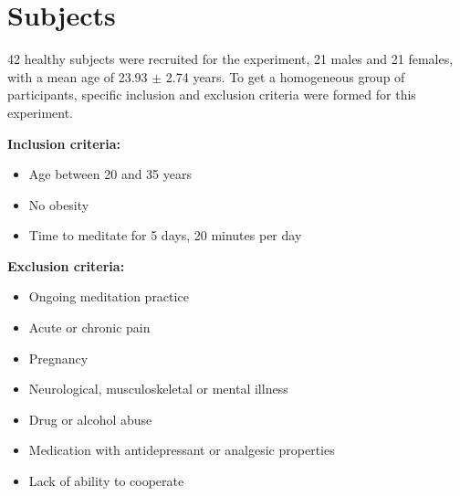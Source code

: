 

\section{Subjects}
42 healthy subjects were recruited for the experiment, 21 males and 21 females, with a mean age of 23.93 $\pm$ 2.74 years. To get a homogeneous group of participants, specific inclusion and exclusion criteria were  formed for this experiment.

\textbf{Inclusion criteria:}
\vspace{-.5cm}
\begin{itemize}
	\vspace{-.3cm}
	\item Age between 20 and 35 years
	\vspace{-.3cm}
	\item No obesity 
	\vspace{-.3cm}
	\item Time to meditate for 5 days, 20 minutes per day
\end{itemize}

\textbf{Exclusion criteria:}
\vspace{-.5cm}
\begin{itemize}
	\item Ongoing meditation practice 
	\vspace{-.3cm}
	\item Acute or chronic pain
	\vspace{-.3cm}
	\item Pregnancy 
	\vspace{-.3cm}
	\item Neurological, musculoskeletal or mental illness
	\vspace{-.3cm}
	\item Drug or alcohol abuse
	\vspace{-.3cm}
	\item Medication with antidepressant or analgesic properties
	\vspace{-.3cm}
	\item Lack of ability to cooperate
\end{itemize}

